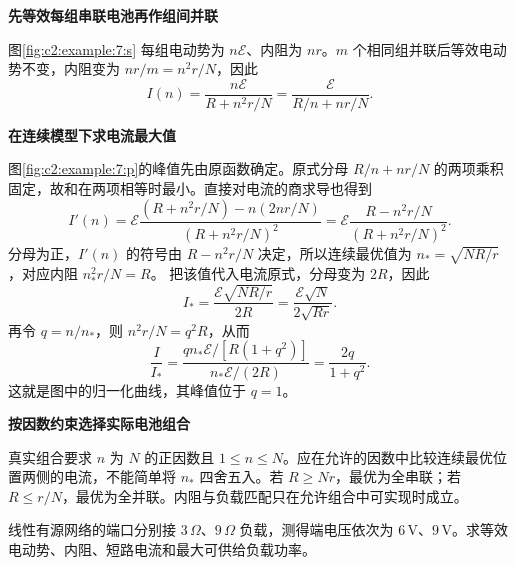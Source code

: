 \begin{solution}\textbf{先等效每组串联电池再作组间并联}\par\nobreak
图\ref{fig:c2:example:7:s} 每组电动势为 $n\mathcal E$、内阻为 $nr$。$m$ 个相同组并联后等效电动势不变，内阻变为 $nr/m=n^2r/N$，因此
\[
 I(n)=\frac{n\mathcal E}{R+n^2r/N}
 =\frac{\mathcal E}{R/n+nr/N}.
\]



\par\medskip{}\noindent\textbf{在连续模型下求电流最大值}\par\nobreak
图\ref{fig:c2:example:7:p}的峰值先由原函数确定。原式分母 $R/n+nr/N$ 的两项乘积固定，故和在两项相等时最小。直接对电流的商求导也得到
\[
 I'(n)=\mathcal E
 \frac{(R+n^2r/N)-n(2nr/N)}{(R+n^2r/N)^2}
 =\mathcal E\frac{R-n^2r/N}{(R+n^2r/N)^2}.
\]
分母为正，$I'(n)$ 的符号由 $R-n^2r/N$ 决定，所以连续最优值为 $n_*=\sqrt{NR/r}$，对应内阻 $n_*^2r/N=R$。
把该值代入电流原式，分母变为 $2R$，因此
\[
 I_*=\frac{\mathcal E\sqrt{NR/r}}{2R}
 =\frac{\mathcal E\sqrt N}{2\sqrt{Rr}}.
\]
再令 $q=n/n_*$，则 $n^2r/N=q^2R$，从而
\[
 \frac{I}{I_*}
 =\frac{q n_*\mathcal E/[R(1+q^2)]}{n_*\mathcal E/(2R)}
 =\frac{2q}{1+q^2}.
\]
这就是图中的归一化曲线，其峰值位于 $q=1$。



\par\medskip{}\noindent\textbf{按因数约束选择实际电池组合}\par\nobreak
真实组合要求 $n$ 为 $N$ 的正因数且 $1\le n\le N$。应在允许的因数中比较连续最优位置两侧的电流，不能简单将 $n_*$ 四舍五入。若 $R\ge Nr$，最优为全串联；若 $R\le r/N$，最优为全并联。内阻与负载匹配只在允许组合中可实现时成立。\end{solution}
\begin{question}\begin{example}[端口的两次负载测量]\label{c2:example:8}
线性有源网络的端口分别接 $3\,\Omega$、$9\,\Omega$ 负载，测得端电压依次为 $6\,\mathrm V$、$9\,\mathrm V$。求等效电动势、内阻、短路电流和最大可供给负载功率。
\end{example}
\end{question}
